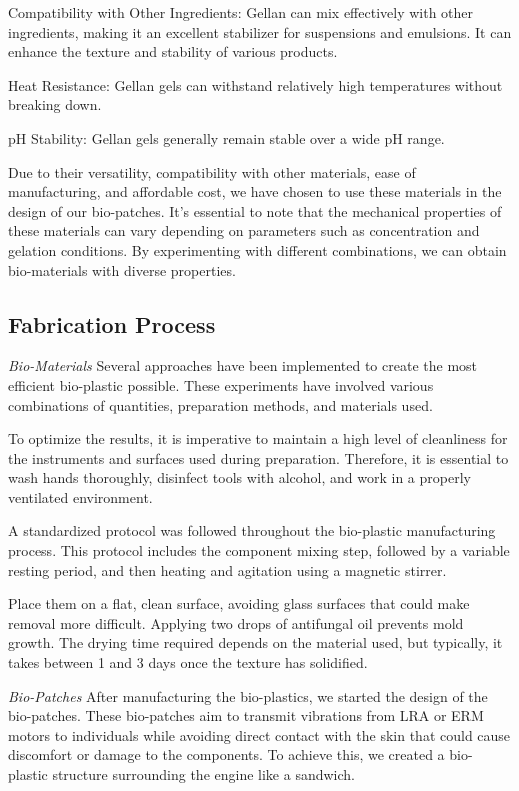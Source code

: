\item Compatibility with Other Ingredients: Gellan can mix effectively with other ingredients, making it an excellent stabilizer for suspensions and emulsions. It can enhance the texture and stability of various products.

\item Heat Resistance: Gellan gels can withstand relatively high temperatures without breaking down.

\item pH Stability: Gellan gels generally remain stable over a wide pH range.

Due to their versatility, compatibility with other materials, ease of manufacturing, and affordable cost, we have chosen to use these materials in the design of our bio-patches. It's essential to note that the mechanical properties of these materials can vary depending on parameters such as concentration and gelation conditions. By experimenting with different combinations, we can obtain bio-materials with diverse properties.

\subsection{Fabrication Process}
\textit{Bio-Materials}
Several approaches have been implemented to create the most efficient bio-plastic possible. These experiments have involved various combinations of quantities, preparation methods, and materials used.

To optimize the results, it is imperative to maintain a high level of cleanliness for the instruments and surfaces used during preparation. Therefore, it is essential to wash hands thoroughly, disinfect tools with alcohol, and work in a properly ventilated environment.

A standardized protocol was followed throughout the bio-plastic manufacturing process. This protocol includes the component mixing step, followed by a variable resting period, and then heating and agitation using a magnetic stirrer. 

Place them on a flat, clean surface, avoiding glass surfaces that could make removal more difficult. Applying two drops of antifungal oil prevents mold growth. The drying time required depends on the material used, but typically, it takes between 1 and 3 days once the texture has solidified.

\textit{Bio-Patches}
After manufacturing the bio-plastics, we started the design of the bio-patches. These bio-patches aim to transmit vibrations from LRA or ERM motors to individuals while avoiding direct contact with the skin that could cause discomfort or damage to the components. To achieve this, we created a bio-plastic structure surrounding the engine like a sandwich.

